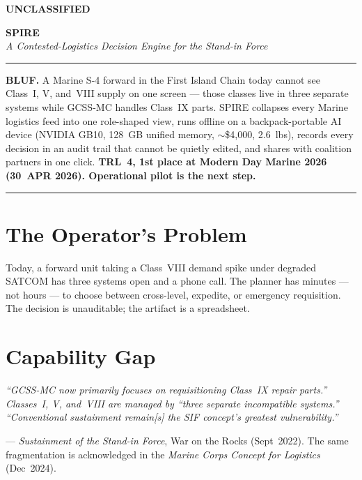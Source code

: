 \documentclass[10.5pt]{extarticle}
\newcommand{\classband}[0]{%
  \begin{center}\textbf{UNCLASSIFIED}\end{center}%
}
\begin{document}
\justifying

\classband

\vspace{6pt}
\begin{center}
  {\fontsize{22pt}{24pt}\selectfont\bfseries SPIRE}\\[2pt]
  {\fontsize{11pt}{13pt}\selectfont\itshape A Contested-Logistics Decision Engine for the Stand-in Force}
\end{center}

\vspace{-2pt}
\noindent\rule{\linewidth}{0.4pt}

\vspace{2pt}
\noindent\textbf{BLUF.} A Marine S-4 forward in the First Island Chain
today cannot see Class~I, V, and~VIII supply on one screen --- those
classes live in three separate systems while GCSS-MC handles Class~IX
parts. SPIRE collapses every Marine logistics feed into one role-shaped
view, runs offline on a backpack-portable AI device (NVIDIA GB10, 128~GB unified memory, $\sim$\$4{,}000, 2.6~lbs), records every decision in an
audit trail that cannot be quietly edited, and shares with coalition
partners in one click. \textbf{TRL~4, 1st place at Modern Day Marine 2026
(30~APR 2026). Operational pilot is the next step.}

\vspace{-2pt}
\noindent\rule{\linewidth}{0.4pt}

\section*{The Operator's Problem}
Today, a forward unit taking a Class~VIII demand spike under degraded SATCOM
has three systems open and a phone call. The planner has minutes --- not
hours --- to choose between cross-level, expedite, or emergency
requisition. The decision is unauditable; the artifact is a spreadsheet.

\section*{Capability Gap}
\begingroup
\leftskip=12pt \rightskip=12pt
\itshape\color{spireRule}
``GCSS-MC now primarily focuses on requisitioning Class~IX repair parts.''
Classes~I, V, and~VIII are managed by ``three separate incompatible
systems.'' ``Conventional sustainment remain[s] the SIF concept's greatest
vulnerability.''
\par\vspace{2pt}
\normalfont\color{spireMuted}\fontsize{9.5pt}{11pt}\selectfont
--- \textit{Sustainment of the Stand-in Force}, War on the Rocks
(Sept~2022). The same fragmentation is acknowledged in the
\textit{Marine Corps Concept for Logistics} (Dec~2024).
\endgroup
\end{document}
